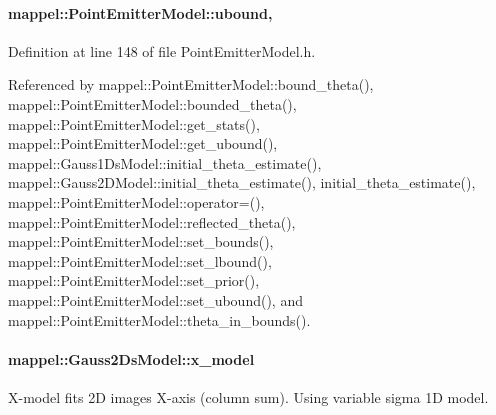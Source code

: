 \paragraph[{\texorpdfstring{ubound}{ubound}}]{ mappel\+::\+Point\+Emitter\+Model\+::ubound\hspace{0.3cm}{\ttfamily [protected]}, {\ttfamily [inherited]}}\hypertarget{classmappel_1_1PointEmitterModel_a35b883e84b6a2e0093bdf482c623beef}{}\label{classmappel_1_1PointEmitterModel_a35b883e84b6a2e0093bdf482c623beef}


Definition at line 148 of file Point\+Emitter\+Model.\+h.



Referenced by mappel\+::\+Point\+Emitter\+Model\+::bound\+\_\+theta(), mappel\+::\+Point\+Emitter\+Model\+::bounded\+\_\+theta(), mappel\+::\+Point\+Emitter\+Model\+::get\+\_\+stats(), mappel\+::\+Point\+Emitter\+Model\+::get\+\_\+ubound(), mappel\+::\+Gauss1\+Ds\+Model\+::initial\+\_\+theta\+\_\+estimate(), mappel\+::\+Gauss2\+D\+Model\+::initial\+\_\+theta\+\_\+estimate(), initial\+\_\+theta\+\_\+estimate(), mappel\+::\+Point\+Emitter\+Model\+::operator=(), mappel\+::\+Point\+Emitter\+Model\+::reflected\+\_\+theta(), mappel\+::\+Point\+Emitter\+Model\+::set\+\_\+bounds(), mappel\+::\+Point\+Emitter\+Model\+::set\+\_\+lbound(), mappel\+::\+Point\+Emitter\+Model\+::set\+\_\+prior(), mappel\+::\+Point\+Emitter\+Model\+::set\+\_\+ubound(), and mappel\+::\+Point\+Emitter\+Model\+::theta\+\_\+in\+\_\+bounds().

\paragraph[{\texorpdfstring{x\+\_\+model}{x_model}}]{ mappel\+::\+Gauss2\+Ds\+Model\+::x\+\_\+model\hspace{0.3cm}{\ttfamily [protected]}}\hypertarget{classmappel_1_1Gauss2DsModel_ab2b2238d5213b2de85897bc60d5dcc4d}{}\label{classmappel_1_1Gauss2DsModel_ab2b2238d5213b2de85897bc60d5dcc4d}
X-\/model fits 2D images X-\/axis (column sum). Using variable sigma 1D model. 

